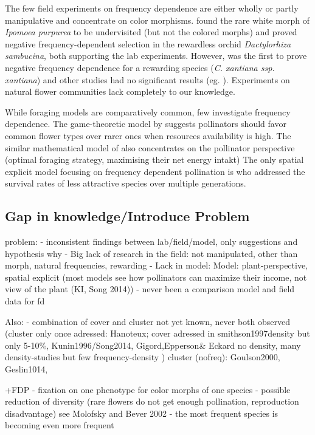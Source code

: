 The few field experiments on frequency dependence are either wholly or partly manipulative and concentrate on color morphisms. \cite{epperson1987frequency} found the rare white morph of \textit{Ipomoea purpurea} to be undervisited (but not the colored morphs) and \cite{gigord2001negative} proved negative frequency-dependent selection in the rewardless orchid \textit{Dactylorhiza sambucina}, both supporting the lab experiments. However, \cite{Eckhart2006frequency} was the first to prove negative frequency dependence for a rewarding species (\textit{C. xantiana ssp. xantiana}) and other studies had no significant results (eg. \citealt{jones1996pollinator, mogford1978pollination}). Experiments on natural flower communities lack completely to our knowledge. 

While foraging models are comparatively common, few investigate frequency dependence. The game-theoretic model by \cite{kunin1996pollinator} suggests pollinators should favor common flower types over rarer ones when resources availability is high. The similar mathematical model of \cite{song2014adaptive} also concentrates on the pollinator perspective (optimal foraging strategy, maximising their net energy intakt) The only spatial explicit model focusing on frequency dependent pollination is \cite{hanoteaux2013effects} who addressed the survival rates of less attractive species over multiple generations. 



\subsection*{Gap in knowledge/Introduce Problem}
problem:
- inconsistent findings between lab/field/model, only suggestions and hypothesis why
- Big lack of research in the field: not manipulated, other than morph, natural frequencies, rewarding
- Lack in model: Model: plant-perspective, spatial explicit (most models see how pollinators can maximize their income, not view of the plant (KI, Song 2014))
- never been a comparison model and field data for fd

Also:
- combination of cover and cluster not yet known, never both observed (cluster only once adressed: Hanoteux; cover adressed in smithson1997density but only 5-10\%, Kunin1996/Song2014, Gigord,Epperson\& Eckard no density, many density-studies but few frequency-density )
cluster (nofreq): Goulson2000, Geslin1014, 

+FDP
- fixation on one phenotype for color morphs of one species
- possible reduction of diversity (rare flowers do not get enough pollination, reproduction disadvantage) see Molofsky and Bever 2002
- the most frequent species is becoming even more frequent


